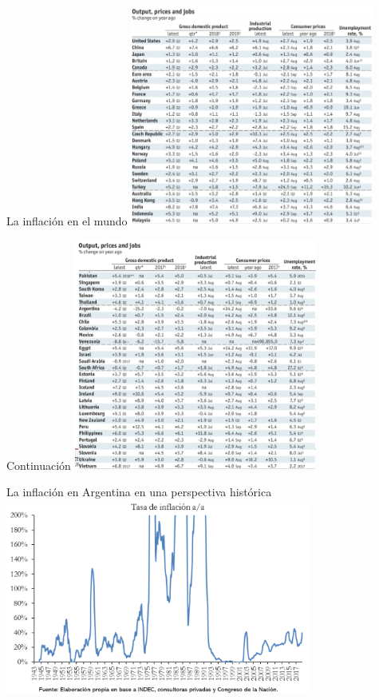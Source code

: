 \documentclass{beamer}
\begin{document}
\begin{frame}{La inflación en el mundo}
    \centering\includegraphics[width=8cm]{P70.png}\
\end{frame}


\begin{frame}{Continuación}
    \centering\includegraphics[width=8cm]{P71.png}\
\end{frame}

\begin{frame}{La inflación en Argentina en una perspectiva histórica}
\centering\includegraphics[width=10cm]{Figures/P59.png}\
\end{frame}
\end{document}

